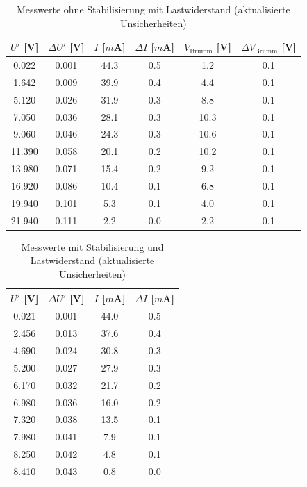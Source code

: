 \documentclass{article}
\theoremstyle{definition}
\begin{document}
\begin{table}[h!]
\centering
\begin{tabular}{|c|c|c|c|c|c|}
\hline
\textbf{$U'$ [V]} & \textbf{$\Delta U'$ [V]} & \textbf{$I$ [$m$A]} & \textbf{$\Delta I$ [$m$A]} & \textbf{$V_\text{Brumm}$ [V]} & \textbf{$\Delta V_\text{Brumm}$ [V]} \\
\hline
0.022 & 0.001 & 44.3 & 0.5 & 1.2 & 0.1 \\
1.642 & 0.009 & 39.9 & 0.4 & 4.4 & 0.1 \\
5.120 & 0.026 & 31.9 & 0.3 & 8.8 & 0.1 \\
7.050 & 0.036 & 28.1 & 0.3 & 10.3 & 0.1 \\
9.060 & 0.046 & 24.3 & 0.3 & 10.6 & 0.1 \\
11.390 & 0.058 & 20.1 & 0.2 & 10.2 & 0.1 \\
13.980 & 0.071 & 15.4 & 0.2 & 9.2 & 0.1 \\
16.920 & 0.086 & 10.4 & 0.1 & 6.8 & 0.1 \\
19.940 & 0.101 & 5.3 & 0.1 & 4.0 & 0.1 \\
21.940 & 0.111 & 2.2 & 0.0 & 2.2 & 0.1 \\
\hline
\end{tabular}
\caption{Messwerte ohne Stabilisierung mit Lastwiderstand (aktualisierte Unsicherheiten)}
\label{tab:Lastwiderstand_mit_Fehlern}
\end{table}



\begin{table}[h!]
\centering
\begin{tabular}{|c|c|c|c|}
\hline
\textbf{$U'$ [V]} & \textbf{$\Delta U'$ [V]} & \textbf{$I$ [$m$A]} & \textbf{$\Delta I$ [$m$A]} \\
\hline
0.021 & 0.001 & 44.0 & 0.5 \\
2.456 & 0.013 & 37.6 & 0.4 \\
4.690 & 0.024 & 30.8 & 0.3 \\
5.200 & 0.027 & 27.9 & 0.3 \\
6.170 & 0.032 & 21.7 & 0.2 \\
6.980 & 0.036 & 16.0 & 0.2 \\
7.320 & 0.038 & 13.5 & 0.1 \\
7.980 & 0.041 & 7.9 & 0.1 \\
8.250 & 0.042 & 4.8 & 0.1 \\
8.410 & 0.043 & 0.8 & 0.0 \\
\hline
\end{tabular}
\caption{Messwerte mit Stabilisierung und Lastwiderstand (aktualisierte Unsicherheiten)}
\label{tab:Stabilisierung_mit_Fehlern}
\end{table}
\end{document}
